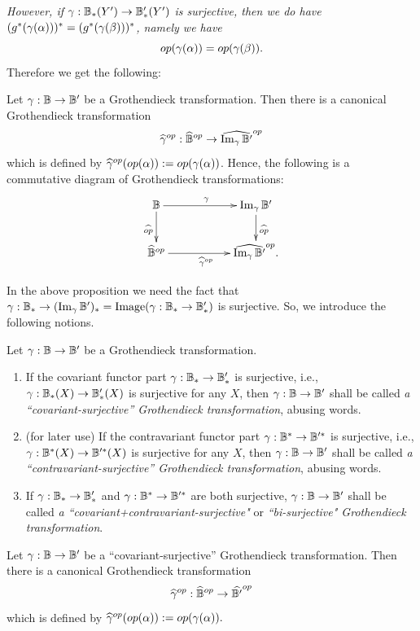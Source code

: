 \documentclass[a4paper]{amsart}
\begin{document}
\emph{However, if $\gamma: \mathbb B_*(Y') \to \mathbb B'_*(Y')$ is surjective, then we do have $(g^*(\gamma(\alpha)))^* = (g^*(\gamma(\beta)))^*$, namely we have
$$op(\gamma(\alpha)) = op(\gamma(\beta)).$$
}
Therefore we get the following:
\begin{pro}\label{im-ga}  Let $\gamma: \mathbb B \to \mathbb B'$ be a Grothendieck transformation. Then there is a canonical Grothendieck transformation
$$\widehat{\gamma}^{op}: \widehat{\mathbb B}^{op} \to \widehat{\operatorname{Im}_{\gamma}\mathbb B'}^{op}$$
which is defined by $\widehat{\gamma}^{op}(op(\alpha)):= op(\gamma(\alpha))$. Hence, the following is a commutative diagram of Grothendieck transformations:
\[
\xymatrix
{
\bB \ar[rr]^{\ga} \ar[d]_{\widehat{op}} && \op{Im}_{\ga}\bB' \ar[d]^{\widehat{op}} \\
\widehat{\bB}^{op} \ar[rr]_{\widehat{\ga}^{op}} && \widehat{\op{Im}_{\ga}\bB'}^{op}. 
}
\]
\end{pro}
In the above proposition we need the fact that 
$\gamma:\mathbb B_* \to (\operatorname{Im}_{\gamma}\mathbb B')_* = \operatorname{Image}(\gamma:\mathbb B_* \to \mathbb B'_*)$ is surjective. So, we introduce the following notions.
\begin{defn}\label{co-surj} Let $\gamma:\mathbb B \to \mathbb B'$ be a Grothendieck transformation. 
\begin{enumerate}
\item If the covariant functor part $\gamma:\mathbb B_* \to \mathbb B'_*$ is surjective, i.e., $\gamma:\mathbb B_*(X) \to \mathbb B'_*(X)$ is surjective for any $X$, then $\gamma:\mathbb B \to \mathbb B'$ shall be called \emph{a ``covariant-surjective'' Grothendieck transformation}, abusing words.  
\item (for later use) If the contravariant functor part $\gamma:\mathbb B^* \to \mathbb B'^*$ is surjective, i.e., $\gamma:\mathbb B^*(X) \to \mathbb B'^*(X)$ is surjective for any $X$, then $\gamma:\mathbb B \to \mathbb B'$ shall be called \emph{a ``contravariant-surjective'' Grothendieck transformation}, abusing words. 
\item If  $\gamma:\mathbb B_* \to \mathbb B'_*$ and  $\gamma:\mathbb B^* \to \mathbb B'^*$ are both surjective, $\gamma:\mathbb B \to \mathbb B'$ shall be called \emph{a ``covariant+contravariant-surjective"} or \emph{``bi-surjective" Grothendieck transformation}.
\end{enumerate}
\end{defn}
\begin{cor}\label{cor-co-surj} Let $\gamma:\mathbb B \to \mathbb B'$ be a ``covariant-surjective'' Grothendieck transformation. Then there is a canonical Grothendieck transformation
$$\widehat{\gamma}^{op}: \widehat{\mathbb B}^{op} \to \widehat{\mathbb B'}^{op}$$
which is defined by $\widehat{\gamma}^{op}(op(\alpha)):= op(\gamma(\alpha)).$
\end{cor}
\end{document}
